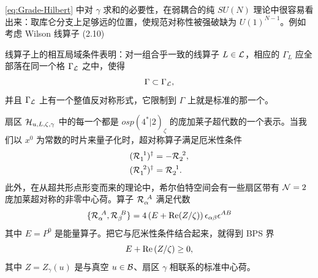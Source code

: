 \eqref{eq:Grade-Hilbert} 中对 $\gamma$ 求和的必要性，在弱耦合的纯 $SU(N)$ 理论中很容易看出来：取库仑分支上足够远的位置，使规范对称性被强破缺为 $U(1)^{N-1}$。例如考虑 Wilson 线算子 (2.10)%

线算子上的相互局域条件表明：对一组合乎一致的线算子 $L\in\mathcal{L}$，相应的 $\Gamma_L$ 应全部落在同一个格 $\Gamma_{\mathcal{L}}$ 之中，使得
\begin{equation}\label{eq:Consist-LO-Latt}
\Gamma \subset \Gamma_{\mathcal{L}},
\end{equation}
并且 $\Gamma_{\mathcal{L}}$ 上有一个整值反对称形式，它限制到 $\Gamma$ 上就是标准的那一个。

扇区 $\mathcal{H}_{u,L,\zeta,\gamma}$ 中的每一个都是 $osp(4^*\vert 2)_\zeta$ 的庞加莱子超代数的一个表示。当我们以 $x^0$ 为常数的时片来量子化时，超对称算子满足厄米性条件
\begin{equation}
\begin{split}
(\mathcal{R}_{1}^{~1})^\dagger & = - \mathcal{R}_{2}^{~2}, \\
(\mathcal{R}_{1}^{~2})^\dagger & =   \mathcal{R}_{2}^{~1}.
\end{split}
\end{equation}
此外，在从超共形点形变而来的理论中，希尔伯特空间会有一些扇区带有 $\mathcal{N}=2$ 庞加莱超对称的非零中心荷。算子 $\mathcal{R}_{\alpha}^{~A}$ 满足代数
\begin{equation}
\{ \mathcal{R}_{\alpha}^{~A} , \mathcal{R}_{\beta}^{~B} \} = 4 \left( E + {\rm Re}(Z/\zeta) \right) \epsilon_{\alpha\beta} \epsilon^{AB}
\end{equation}
其中 $E=P^0$ 是能量算子。把它与厄米性条件结合起来，就得到 BPS 界
\begin{equation} \label{eq:bps-bound-3d}
E + {\rm Re}\, (Z / \zeta) \geq 0,
\end{equation}
其中 $Z = Z_\gamma(u)$ 是与真空 $u\in \mathcal{B}$、扇区 $\gamma$ 相联系的标准中心荷。

